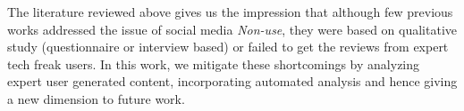 The literature reviewed above gives us the impression that although few previous works addressed the issue of social media \textit{Non-use}, they were based on qualitative study (questionnaire or interview based) \cite{baumer2013limiting, nonnecke2001lurkers} or failed to get the reviews from expert tech freak users. In this work, we mitigate these shortcomings by analyzing expert user generated content, incorporating automated analysis and hence giving a new dimension to future work.  